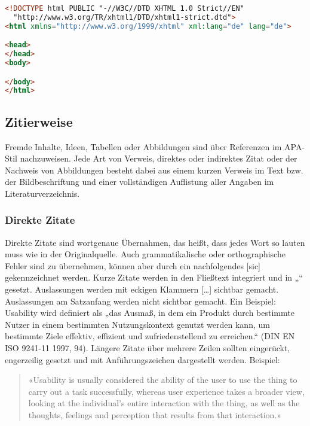 \begin{lstlisting}[language=HTML,caption={So sieht Code schön aus.},captionpos=b,label=code:arduino_blink]
<!DOCTYPE html PUBLIC "-//W3C//DTD XHTML 1.0 Strict//EN"
  "http://www.w3.org/TR/xhtml1/DTD/xhtml1-strict.dtd">
<html xmlns="http://www.w3.org/1999/xhtml" xml:lang="de" lang="de">

<head>
</head>
<body>

</body>
</html>
\end{lstlisting}


\subsection{Zitierweise}\label{subsec:zitierweise}

Fremde Inhalte, Ideen, Tabellen oder Abbildungen sind über Referenzen im APA-Stil nachzuweisen. Jede Art von Verweis, direktes oder indirektes Zitat oder der Nachweis von Abbildungen besteht dabei aus einem kurzen Verweis im Text bzw. der Bildbeschriftung und einer vollständigen Auflistung aller Angaben im Literaturverzeichnis.

\subsubsection{Direkte Zitate}\label{subsubsec:direkte}

Direkte Zitate sind wortgenaue Übernahmen, das heißt, dass jedes Wort so lauten muss wie in der Originalquelle. Auch grammatikalische oder orthographische Fehler sind zu übernehmen, können aber durch ein nachfolgendes [sic] gekennzeichnet werden. Kurze Zitate werden in den Fließtext integriert und in „“ gesetzt. Auslassungen werden mit eckigen Klammern […] sichtbar gemacht. Auslassungen am Satzanfang werden nicht sichtbar gemacht. Ein Beispiel: Usability wird definiert als „das Ausmaß, in dem ein Produkt durch bestimmte Nutzer in einem bestimmten Nutzungskontext genutzt werden kann, um bestimmte Ziele effektiv, effizient und zufriedenstellend zu erreichen.“ (DIN EN ISO 9241-11 1997, 94). Längere Zitate über mehrere Zeilen sollten eingerückt, engerzeilig gesetzt und mit Anführungszeichen dargestellt werden. Beispiel:


\begin{quote}
«Usability is usually considered the ability of the user to use the thing to carry out a task successfully, whereas user experience takes a broader view, looking at the individual’s entire interaction with the thing, as well as the thoughts, feelings and perception that results from that interaction.»
\cite[4]{albert2013measuring}
\end{quote}


